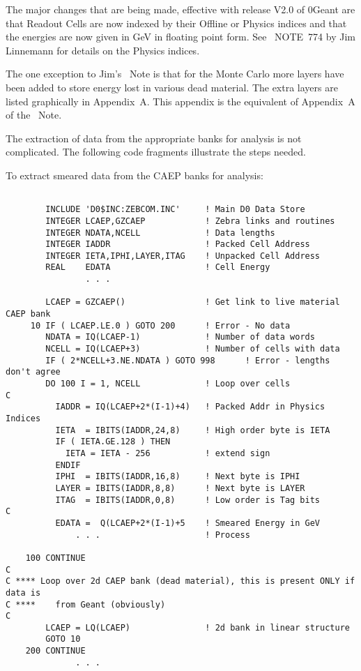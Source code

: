 The major changes that are being made, effective with release V2.0 of
\D0Geant are that Readout Cells are now indexed by their Offline or Physics
indices and that the energies are now given in GeV in floating point form. See
~NOTE~774 by Jim Linnemann for details on the Physics indices.

The one exception to Jim's ~Note is that for the Monte Carlo more layers have
been added to store energy lost in various dead material. The extra layers are
listed graphically in Appendix~A. This appendix is the equivalent of Appendix~A
of the ~Note.

The extraction of data from the appropriate banks for analysis is not
complicated. The following code fragments illustrate the steps needed.

To extract smeared data from the CAEP banks for analysis:

\begin{verbatim}

        INCLUDE 'D0$INC:ZEBCOM.INC'     ! Main D0 Data Store
        INTEGER LCAEP,GZCAEP            ! Zebra links and routines
        INTEGER NDATA,NCELL             ! Data lengths
        INTEGER IADDR                   ! Packed Cell Address
        INTEGER IETA,IPHI,LAYER,ITAG    ! Unpacked Cell Address
        REAL    EDATA                   ! Cell Energy
                . . .

        LCAEP = GZCAEP()                ! Get link to live material CAEP bank
     10 IF ( LCAEP.LE.0 ) GOTO 200      ! Error - No data
        NDATA = IQ(LCAEP-1)             ! Number of data words
        NCELL = IQ(LCAEP+3)             ! Number of cells with data
        IF ( 2*NCELL+3.NE.NDATA ) GOTO 998      ! Error - lengths don't agree
        DO 100 I = 1, NCELL             ! Loop over cells
C
          IADDR = IQ(LCAEP+2*(I-1)+4)   ! Packed Addr in Physics Indices
          IETA  = IBITS(IADDR,24,8)     ! High order byte is IETA
          IF ( IETA.GE.128 ) THEN
            IETA = IETA - 256           ! extend sign
          ENDIF
          IPHI  = IBITS(IADDR,16,8)     ! Next byte is IPHI
          LAYER = IBITS(IADDR,8,8)      ! Next byte is LAYER
          ITAG  = IBITS(IADDR,0,8)      ! Low order is Tag bits
C
          EDATA =  Q(LCAEP+2*(I-1)+5    ! Smeared Energy in GeV
              . . .                     ! Process

    100 CONTINUE
C
C **** Loop over 2d CAEP bank (dead material), this is present ONLY if data is
C ****    from Geant (obviously)
C
        LCAEP = LQ(LCAEP)               ! 2d bank in linear structure
        GOTO 10
    200 CONTINUE
              . . .

\end{verbatim}

